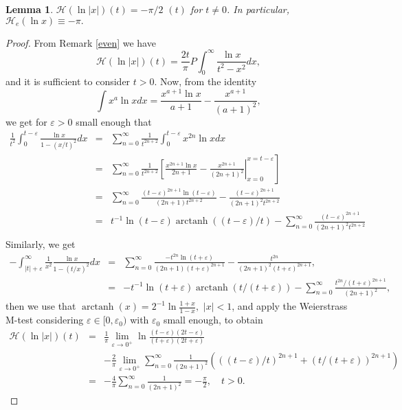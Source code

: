 \documentclass{amsart}
\DeclareMathOperator{\arctanh}{arctanh}
\newtheorem{lemma}[theorem]{Lemma}
\begin{document}
\begin{lemma}\label{hilon}
$\mathcal{H}(\ln|x|)(t)= -\pi/2$ $(t)$ for  $t\neq 0$. In particular, $\mathcal{H}_e(\ln x)\equiv -\pi.$
\end{lemma}
\begin{proof}
From Remark \ref{even} we have
$$\mathcal{H}(\ln|x|)(t)=\frac{2t}{\pi}P \int_0^\infty \frac{\ln x}{t^2-x^2}dx,$$
and it is sufficient to consider $t>0$. Now, from the identity
$$ \int x^a \ln xdx=\frac{x^{a+1} \ln x}{a+1}-\frac{x^{a+1}}{(a+1)^2},$$
we get for $\varepsilon>0$ small enough that
\begin{eqnarray*}
\frac{1}{t^2}\int_0^{t-\varepsilon}\frac{\ln x}{1-(x/t)^2}dx&=&\sum_{n=0}^{\infty}\frac{1}{t^{2n+2}}\int_0^{t-\varepsilon}x^{2n}\ln xdx\\
&=&\left. \sum_{n=0}^{\infty}\frac{1}{t^{2n+2}}\left[\frac{x^{2n+1} \ln x}{2n+1}-\frac{x^{2n+1}}{(2n+1)^2}\right|_{x=0}^{x=t-\varepsilon}\right]\\
&=& \sum_{n=0}^{\infty}\frac{(t-\varepsilon)^{2n+1} \ln(t-\varepsilon)}{(2n+1)t^{2n+2}}-\frac{(t-\varepsilon)^{2n+1}}{(2n+1)^2t^{2n+2}}\\
&=& t^{-1}\ln(t-\varepsilon)\arctanh((t-\varepsilon)/t)-\sum_{n=0}^{\infty}\frac{(t-\varepsilon)^{2n+1}}{(2n+1)^2t^{2n+2}}\\
\end{eqnarray*}
Similarly, we get
\begin{eqnarray*}
-\int^\infty_{|t|+\varepsilon}\frac{1}{x^2}\frac{\ln x}{1-(t/x)^2}dx&=& \sum_{n=0}^{\infty}\frac{-t^{2n} \ln(t+\varepsilon)}{(2n+1)(t+\varepsilon)^{2n+1}}-\frac{t^{2n}}{(2n+1)^2(t+\varepsilon)^{2n+1}},\\
&=&-t^{-1} \ln(t+\varepsilon)\arctanh(t/(t+\varepsilon))-\sum_{n=0}^{\infty}\frac{t^{2n}/(t+\varepsilon)^{2n+1}}{(2n+1)^2},
\end{eqnarray*}
then we use that $\arctanh(x)=2^{-1}\ln\frac{1+x}{1-x} ,$ $|x|<1$, and apply the Weierstrass M-test considering $\varepsilon\in[0,\varepsilon_0)$ with $\varepsilon_0$ small enough, to obtain
\begin{eqnarray*}
\mathcal{H}(\ln|x|)(t)&=&\frac{1}{\pi}\lim_{\varepsilon\rightarrow 0^+} \ln\frac{(t-\varepsilon)(2t-\varepsilon)}{(t+\varepsilon)(2t+\varepsilon)} \\
&&-\frac{2}{\pi}\lim_{\varepsilon\rightarrow 0^+}\sum_{n=0}^{\infty}\frac{1}{(2n+1)^2}\left( \left((t-\varepsilon)/t\right)^{2n+1}+(t/(t+\varepsilon))^{2n+1}\right)\\
&=&-\frac{4}{\pi}\sum_{n=0}^{\infty}\frac{1}{(2n+1)^2}=-\frac{\pi}{2},\quad t>0.
\end{eqnarray*}
\end{proof}
\end{document}
